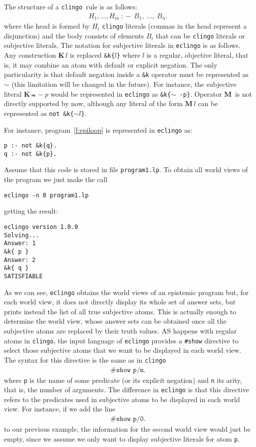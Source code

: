\documentclass{new_tlp}
\def\K{\mathbf{K}\, }
\def\M{\mathbf{M}\, }
\def\eclingo{{\tt eclingo}}
\def\clingo{{\tt clingo}}
\begin{document}
The structure of a \clingo\ rule is as follows:
\begin{align*}
    H_1,\dots,H_m \ \mathtt{:\!-} \ B_1,\ \dots ,\ B_n.
\end{align*}
where the head is formed by $H_i$ \clingo{} literals (commas in the head represent a disjunction) and the body consists of elements $B_i$ that can be \clingo{} literals or subjective literals.
%
The notation for subjective literals in \eclingo{} is as follows.
%
Any construction $\K l$ is replaced {\tt \&k\{$l$\}} where $l$ is a regular, objective literal, that is, it may combine an atom with default or explicit negation.
%
The only particularity is that default negation inside a {\tt \&k} operator must be represented as $\sim$ (this limitation will be changed in the future).
%
For instance, the subjective literal $\K \Not \, -p$ would be represented in \eclingo{} as \mbox{\tt \&k\{$\sim$ -p\}}.
%
Operator $\M$ is not directly supported by now, although any literal of the form $\M l$ can be represented as {\tt not \&k\{$\sim l$\}}.

For instance, program~\eqref{f:epiloop} is represented in \eclingo{} as:
\begin{Verbatim}[frame=single]
p :- not &k{q}.
q :- not &k{p}.
\end{Verbatim}

Assume that this code is stored in file {\tt program1.lp}.
%
To obtain all world views of the program we just make the call
\begin{verbatim}
eclingo -n 0 program1.lp
\end{verbatim}
getting the result:
\begin{Verbatim}[frame=single]
eclingo version 1.0.0
Solving...
Answer: 1
&k{ p }
Answer: 2
&k{ q }
SATISFIABLE
\end{Verbatim}
As we can see, \eclingo{} obtains the world views of an epistemic program but, for each world view, it does not directly display its whole set of answer sets, but prints instead the list of all true subjective atoms.
%
This is actually enough to determine the world view, whose answer sets can be obtained once all the subjective atoms are replaced by their truth values.
%
AS happens with regular atoms in \clingo{}, the input language of  \eclingo{} provides a {\tt \#show} directive to select those subjective atoms that we want to be displayed in each world view.
%
The syntax for this directive is the same as in \clingo{}
\begin{align*}
    \texttt{\#show p/n.}
\end{align*}
where {\tt p} is the name of some predicate (or its explicit negation) and {\tt n} its arity, that is, the number of arguments.
%
The difference in \eclingo{} is that this directive refers to the predicates used in subjective atoms to be displayed in each world view.
For instance, if we add the line
\begin{align*}
    \texttt{\#show p/0.}
\end{align*}
to our previous example, the information for the second world view would just be empty, since we assume we only want to display subjective literals for atom {\tt p}.
\end{document}
